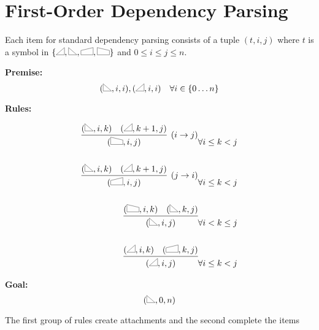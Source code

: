 \documentclass{article}
\begin{document}
\newcommand{\rtri}{\scalebox{0.2}{\tikz{
    \coordinate (A) at (0,0);
    \coordinate (B) at (90:1.5cm);
    \coordinate (C) at (180:-1.7cm);
    \draw[line width = 0.05cm] (A)--(B)--(C)--cycle;
    }}}

\newcommand{\ltri}{\scalebox{0.2}{\tikz{
    \coordinate (A) at (0,0);
    \coordinate (B) at (90:1.5cm);
    \coordinate (C) at (180:1.7cm);
    \draw[line width = 0.05cm] (A)--(B)--(C)--cycle;
    }}}


\section{First-Order Dependency Parsing }

Each item for standard dependency parsing consists of a tuple $(t, i, j)$ where $t$ is a symbol in $\{\ltri,\rtri, \ltrap, \rtrap \}$  and $0\leq i \leq j \leq n$.

\noindent \textbf{Premise:}
\[(\rtri, i,i), (\ltri, i,i)\ \ \  \forall i \in \{0 \ldots n\}\]


\noindent\textbf{Rules:}

\begin{eqnarray*}
\infer[(i \rightarrow j)]{(\rtrap, i,j)}{(\rtri, i,k)  &  (\ltri, k+1, j) } & \forall i\leq k < j \\\\
\infer[(j \rightarrow i)]{(\ltrap, i,j)}{(\rtri, i,k)  &  (\ltri, k+1, j) } & \forall i\leq k < j \\\\
\infer{(\rtri, i,j)}{(\rtrap, i,k)  &  (\rtri, k, j) }    &  \forall i< k \leq j \\\\
\infer{(\ltri, i,j)}{(\ltri, i,k)  &  (\ltrap, k, j) }  & \forall i\leq k < j
\end{eqnarray*}

\noindent \textbf{Goal:}\[ (\rtri, 0,n)\]

The first group of rules create attachments and the second complete the items


\end{document}
